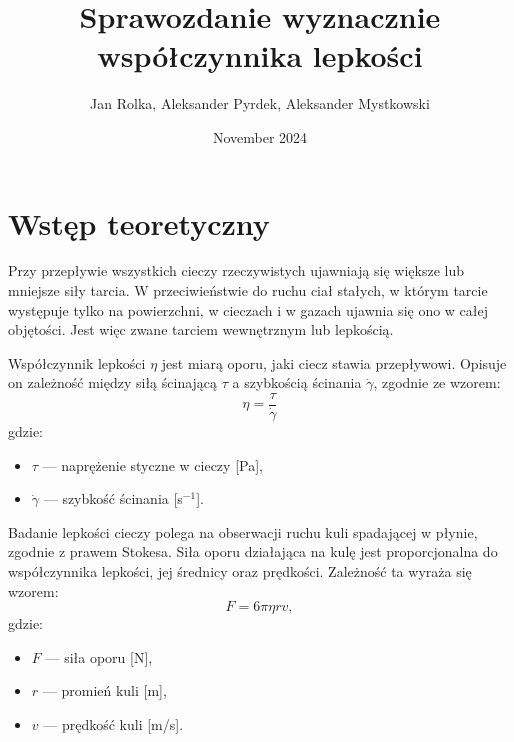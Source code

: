 \documentclass{article}
\title{Sprawozdanie wyznacznie współczynnika lepkości}
\author{Jan Rolka, Aleksander Pyrdek, Aleksander Mystkowski}
\date{November 2024}
\begin{document}
\maketitle
\newpage

\section{Wstęp teoretyczny}

\vspace{0.5cm}

Przy przepływie wszystkich cieczy rzeczywistych ujawniają się większe lub mniejsze siły tarcia. W przeciwieństwie do ruchu ciał stałych, w którym tarcie występuje tylko na powierzchni, w cieczach i w gazach ujawnia się ono w całej objętości. Jest więc zwane tarciem wewnętrznym lub lepkością.

\vspace{0.5cm}

Współczynnik lepkości \(\eta\) jest miarą oporu, jaki ciecz stawia przepływowi. Opisuje on zależność między siłą ścinającą \(\tau\) a szybkością ścinania \(\dot{\gamma}\), zgodnie ze wzorem:
\[
\eta = \frac{\tau}{\dot{\gamma}}
\]
gdzie:
\begin{itemize}
    \item \(\tau\) — naprężenie styczne w cieczy [Pa],
    \item \(\dot{\gamma}\) — szybkość ścinania [s\(^{-1}\)].
\end{itemize}

\vspace{0.5cm}

Badanie lepkości cieczy polega na obserwacji ruchu kuli spadającej w płynie, zgodnie z prawem Stokesa. Siła oporu działająca na kulę jest proporcjonalna do współczynnika lepkości, jej średnicy oraz prędkości. Zależność ta wyraża się wzorem:
\[
F = 6 \pi \eta r v,
\]
gdzie:
\begin{itemize}
    \item \(F\) — siła oporu [N],
    \item \(r\) — promień kuli [m],
    \item \(v\) — prędkość kuli [m/s].
\end{itemize}
\end{document}
